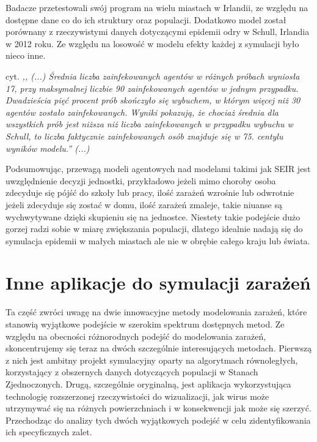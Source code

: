 Badacze przetestowali swój program na wielu miastach w Irlandii, ze względu na dostępne dane co do ich struktury oraz populacji.
Dodatkowo model został porównany z rzeczywistymi danych dotyczącymi epidemii odry w Schull, Irlandia w 2012 roku. Ze względu na losowość w modelu efekty każdej z symulacji było nieco inne. 

cyt. \textit{,, (...) Średnia liczba zainfekowanych agentów w różnych próbach wyniosła 17, przy maksymalnej liczbie 90 zainfekowanych agentów w jednym przypadku. Dwadzieścia pięć procent prób skończyło się wybuchem, w którym więcej niż 30 agentów zostało zainfekowanych. Wyniki pokazują, że chociaż średnia dla wszystkich prób jest niższa niż liczba zainfekowanych w przypadku wybuchu w Schull, to liczba faktycznie zainfekowanych osób znajduje się w 75. centylu wyników modelu.'' (...)} \cite{bib:artykul1}

Podsumowując, przewagą modeli agentowych nad modelami takimi jak SEIR jest uwzględnienie decyzji jednostki, przykładowo jeżeli mimo choroby osoba zdecyduje się pójść do szkoły lub pracy, ilość zarażeń wzrośnie lub odwrotnie jeżeli zdecyduje się zostać w domu, ilość zarażeń zmaleje, takie niuanse są wychwytywane dzięki skupieniu się na jednostce. Niestety takie podejście dużo gorzej radzi sobie w miarę zwiększania populacji, dlatego idealnie nadają się do symulacja epidemii w małych miastach ale nie w obrębie całego kraju lub świata.

\section{\textbf{Inne aplikacje do symulacji zarażeń}}

Ta część zwróci uwagę na dwie innowacyjne metody modelowania zarażeń, które stanowią wyjątkowe podejście w szerokim spektrum dostępnych metod. Ze względu na obecności różnorodnych podejść do modelowania zarażeń, skoncentrujemy się teraz na dwóch szczególnie interesujących metodach. Pierwszą z nich jest ambitny projekt symulacyjny oparty na algorytmach równoległych, korzystający z obszernych danych dotyczących populacji w Stanach Zjednoczonych. Drugą, szczególnie oryginalną, jest aplikacja wykorzystująca technologię rozszerzonej rzeczywistości do wizualizacji, jak wirus może utrzymywać się na różnych powierzchniach i w konsekwencji jak może się szerzyć. Przechodząc do analizy tych dwóch wyjątkowych podejść w celu zidentyfikowania ich specyficznych zalet.

